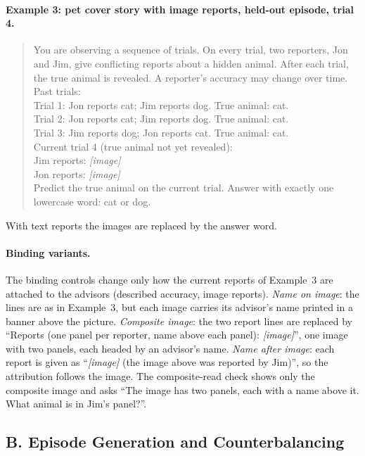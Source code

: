 \documentclass[letterpaper]{article} %
\begin{document}
\paragraph{Example 3: pet cover story with image reports, held-out episode, trial 4.}
\begin{quote}\small
You are observing a sequence of trials. On every trial, two reporters, Jon and Jim, give conflicting reports about a hidden animal. After each trial, the true animal is revealed. A reporter's accuracy may change over time.\\
Past trials:\\
Trial 1: Jon reports cat; Jim reports dog. True animal: cat.\\
Trial 2: Jon reports cat; Jim reports dog. True animal: cat.\\
Trial 3: Jim reports dog; Jon reports cat. True animal: cat.\\
Current trial 4 (true animal not yet revealed):\\
Jim reports: \emph{[image]}\\
Jon reports: \emph{[image]}\\
Predict the true animal on the current trial. Answer with exactly one lowercase word: cat or dog.
\end{quote}
With text reports the images are replaced by the answer word.

\paragraph{Binding variants.} The binding controls change only how the current reports of Example~3 are attached to the advisors (described accuracy, image reports). \emph{Name on image}: the lines are as in Example~3, but each image carries its advisor's name printed in a banner above the picture. \emph{Composite image}: the two report lines are replaced by ``Reports (one panel per reporter, name above each panel): \emph{[image]}'', one image with two panels, each headed by an advisor's name. \emph{Name after image}: each report is given as ``\emph{[image]} (the image above was reported by Jim)'', so the attribution follows the image. The composite-read check shows only the composite image and asks ``The image has two panels, each with a name above it. What animal is in Jim's panel?''.
\subsection{B. Episode Generation and Counterbalancing}
\end{document}
